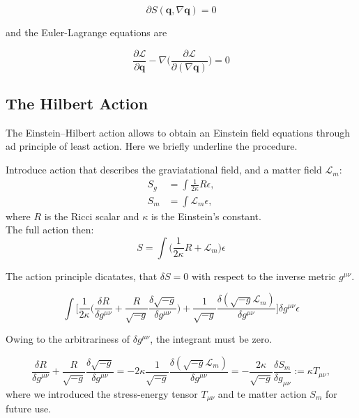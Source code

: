 \documentclass[11pt,a4paper,headinclude=true,DIV=14,BCOR=8mm,chapterprefix,listof=totoc,twoside,openright,abstracton]{scrbook}
\begin{document}
\begin{equation}
    \partial S(\boldsymbol{q}, \nabla\boldsymbol{q}) = 0
\end{equation}

and the Euler-Lagrange equations are

\begin{equation}
    \frac{\partial \mathcal{L}}{\partial\boldsymbol{q}} - \nabla\Big(\frac{\partial\mathcal{L}}{\partial(\nabla\boldsymbol{q})}\Big) = 0
    \label{eq:theory:eulerlagrange}
\end{equation}

\subsection{The Hilbert Action}

The Einstein–Hilbert action allows to obtain an Einstein field equations through ad principle of least action. Here we briefly underline the procedure.

Introduce action that describes the graviatational field, and a matter field $\mathcal{L}_m$:
\begin{align}
    S_g &= \int\frac{1}{2\kappa}R\epsilon, \\
    S_m &= \int\mathcal{L}_{m}\epsilon,
\end{align}
where $R$ is the Ricci scalar and $\kappa$ is the  Einstein's constant. \\

The full action then:
\begin{equation}
    S = \int\Big(\frac{1}{2\kappa}R+\mathcal{L}_m\Big)\epsilon
\end{equation}

The action principle dicatates, that $\delta S = 0$  with respect to the inverse metric $g^{\mu\nu}$. 

\begin{equation}
    \int\Bigg[\frac{1}{2\kappa}\Big(\frac{\delta R}{\delta g^{\mu\nu}}+\frac{R}{\sqrt{-g}}\frac{\delta\sqrt{-g}}{\delta g^{\mu\nu}}\Big) + \frac{1}{\sqrt{-g}}\frac{\delta(\sqrt{-g}\mathcal{L}_m)}{\delta g^{\mu\nu}}\Bigg]\delta g^{\mu\nu}\epsilon
\end{equation}

Owing to the arbitrariness of $\delta g^{\mu\nu}$, the integrant must be zero. 

\begin{equation}
    \frac{\delta R}{\delta g^{\mu\nu}} + \frac{R}{\sqrt{-g}}\frac{\delta\sqrt{-g}}{\delta g^{\mu\nu}} = -2\kappa\frac{1}{\sqrt{-g}}\frac{\delta(\sqrt{-g}\mathcal{L}_m)}{\delta g^{\mu\nu}} = -\frac{2\kappa}{\sqrt{-g}}\frac{\delta S_m}{\delta g_{\mu\nu}} := \kappa T_{\mu\nu},
    \label{eq:theory:action1}
\end{equation}
where we introduced the stress-energy tensor $T_{\mu\nu}$ and te matter action $S_m$ for future use. \\
\end{document}
